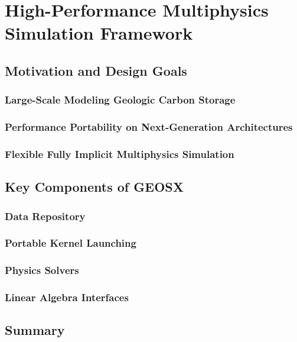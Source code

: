 \chapter{High-Performance Multiphysics Simulation Framework}

\section{Motivation and Design Goals}

\subsection{Large-Scale Modeling Geologic Carbon Storage}

\subsection{Performance Portability on Next-Generation Architectures}

\subsection{Flexible Fully Implicit Multiphysics Simulation}

\section{Key Components of GEOSX}

\subsection{Data Repository}

\subsection{Portable Kernel Launching}

\subsection{Physics Solvers}

\subsection{Linear Algebra Interfaces}

\section{Summary}